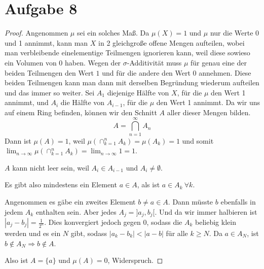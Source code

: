 \documentclass[10pt,a4paper]{article}
\begin{document}
\section{Aufgabe 8}
\begin{proof}
  Angenommen $\mu$ sei ein solches Maß.
  Da $\mu(X) = 1$ und $\mu$ nur die Werte 0 und 1 annimmt, kann man $X$ in 2 gleichgroße offene Mengen aufteilen, wobei man verbleibende einelementige Teilmengen ignorieren kann, weil diese sowieso ein Volumen von 0 haben.
  Wegen der $\sigma$-Additivität muss $\mu$ für genau eine der beiden Teilmengen den Wert $1$ und für die andere den Wert $0$ annehmen.
  Diese beiden Teilmengen kann man dann mit derselben Begründung wiederum aufteilen und das immer so weiter.
  Sei $A_{1}$ diejenige Hälfte von $X$, für die $\mu$ den Wert 1 annimmt, und $A_{i}$ die Hälfte von $A_{i - 1}$, für die $\mu$ den Wert 1 annimmt.
  Da wir uns auf einem Ring befinden, können wir den Schnitt $A$ aller dieser Mengen bilden.
  \begin{equation}
    A = \bigcap_{n = 1}^{\infty} A_{n}
  \end{equation}
  Dann ist $\mu(A) = 1$, weil $\mu(\cap_{k = 1}^{n} A_{k}) = \mu(A_{k}) = 1$ und somit $\lim_{n \rightarrow \infty} \mu(\cap_{k = 1}^{n} A_{k}) = \lim_{n \rightarrow \infty} 1 = 1$.

  $A$ kann nicht leer sein, weil $A_{i} \in A_{i - 1}$ und $A_{i} \neq \emptyset$.
  
  Es gibt also mindestens ein Element $a \in A$, als ist $a \in A_{k}\ \forall k$.

  Angenommen es gäbe ein zweites Element $b \neq a \in A$.
  Dann müsste $b$ ebenfalls in jedem $A_{k}$ enthalten sein.
  Aber jedes $A_{j} = ]a_{j}, b_{j}[$.
  Und da wir immer halbieren ist $|a_{j} - b_{j}| = \frac{1}{2^{n}}$.
  Dies konvergiert jedoch gegen $0$, sodass die $A_{k}$ beliebig klein werden und es ein $N$ gibt, sodass $|a_{k} - b_{k}| < |a - b|$ für alle $k \ge N$.
  Da $a \in A_{N}$, ist $b \notin A_{N} \Rightarrow b \notin A$.

  Also ist $A = \{ a \}$ und $\mu(A) = 0$, Widerspruch.
\end{proof}
\end{document}
